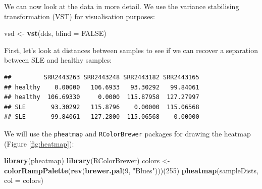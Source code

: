 \documentclass[9pt,a4paper,]{extarticle}
\newenvironment{Shaded}{\begin{snugshade}}{\end{snugshade}}
\newcommand{\KeywordTok}[1]{\textcolor[rgb]{0.13,0.29,0.53}{\textbf{#1}}}
\newcommand{\DataTypeTok}[1]{\textcolor[rgb]{0.13,0.29,0.53}{#1}}
\newcommand{\DecValTok}[1]{\textcolor[rgb]{0.00,0.00,0.81}{#1}}
\newcommand{\StringTok}[1]{\textcolor[rgb]{0.31,0.60,0.02}{#1}}
\newcommand{\OtherTok}[1]{\textcolor[rgb]{0.56,0.35,0.01}{#1}}
\newcommand{\OperatorTok}[1]{\textcolor[rgb]{0.81,0.36,0.00}{\textbf{#1}}}
\newcommand{\NormalTok}[1]{#1}
\begin{document}
We can now look at the data in more detail.
We use the variance stabilising transformation (VST) \citep{Anders2010} for visualisation purposes:

\begin{Shaded}
\begin{Highlighting}[]
\NormalTok{vsd <-}\StringTok{ }\KeywordTok{vst}\NormalTok{(dds, }\DataTypeTok{blind =} \OtherTok{FALSE}\NormalTok{)}
\end{Highlighting}
\end{Shaded}

First, let's look at distances between samples to see if we can recover a separation between SLE and healthy samples:

\begin{Shaded}
\end{Shaded}

\begin{verbatim}
##         SRR2443263 SRR2443248 SRR2443182 SRR2443165
## healthy    0.00000   106.6933   93.30292   99.84061
## healthy  106.69330     0.0000  115.87958  127.27997
## SLE       93.30292   115.8796    0.00000  115.06568
## SLE       99.84061   127.2800  115.06568    0.00000
\end{verbatim}

We will use the \texttt{pheatmap} \citep{Kolde2015} and \texttt{RColorBrewer} \citep{Neuwirth2014} packages for drawing the heatmap (Figure \ref{fig:heatmap}):

\begin{Shaded}
\begin{Highlighting}[]
\KeywordTok{library}\NormalTok{(pheatmap)}
\KeywordTok{library}\NormalTok{(RColorBrewer)}
\NormalTok{colors <-}\StringTok{ }\KeywordTok{colorRampPalette}\NormalTok{(}\KeywordTok{rev}\NormalTok{(}\KeywordTok{brewer.pal}\NormalTok{(}\DecValTok{9}\NormalTok{, }\StringTok{"Blues"}\NormalTok{)))(}\DecValTok{255}\NormalTok{)}
\KeywordTok{pheatmap}\NormalTok{(sampleDists, }\DataTypeTok{col =}\NormalTok{ colors)}
\end{Highlighting}
\end{Shaded}
\end{document}
